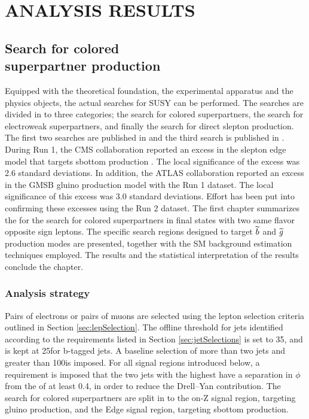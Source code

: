 \part{ANALYSIS RESULTS}
\chapter{Search for colored \\superpartner production}\label{sec:strong}
\noindent\justify
Equipped with the theoretical foundation, the experimental apparatus and the physics objects, the actual searches for SUSY can be performed.
The searches are divided in to three categories; the search for colored superpartners, the search for electroweak superpartners, and finally the search for direct slepton production. 
The first two searches are published in \cite{Sirunyan:2017qaj} and the third search is published in \cite{Sirunyan:2018nwe}.  
\newpara
\noindent\justify
During Run 1, the CMS collaboration reported an excess in the slepton edge model that targets sbottom production \cite{Khachatryan:2015lwa}. 
The local significance of the excess was 2.6 standard deviations. 
In addition, the ATLAS collaboration reported an excess in the GMSB gluino production model \cite{Aad:2015wqa} with the Run 1 dataset.  
The local significance of this excess was 3.0 standard deviations. 
Effort has been put into confirming these excesses using the Run 2 dataset.
\newpara
\noindent\justify 
The first chapter summarizes the for the search for colored superpartners in final states with two same flavor opposite sign leptons. 
The specific search regions designed to target $\widetilde{b}$ and $\widetilde{g}$ production modes are presented, together with the SM background estimation techniques employed. 
The results and the statistical interpretation of the results conclude the chapter. 
\newpage
\section{Analysis strategy}
\noindent
\justify
Pairs of electrons or pairs of muons are selected using the lepton selection criteria outlined in Section \ref{sec:lepSelection}.  
The offline \pt threshold for jets identified according to the requirements listed in Section \ref{sec:jetSelections} is set to 35\GeV, and is kept at 25\GeV for b-tagged jets.
A baseline selection of more than two jets and \ptmiss greater than 100\GeV is imposed. 
For all signal regions introduced below, a requirement is imposed that the two jets with the highest \pt have a separation in $\phi$ from the \ptmiss of at least 0.4, in order to reduce the Drell--Yan contribution.
The search for colored superpartners are split in to the on-Z signal region, targeting gluino production, and the Edge signal region, targeting sbottom production.
